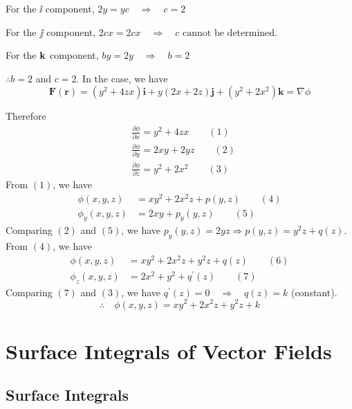 \begin{spacing}{1.3}
    For the $\ii$ component, $2 y=y c \quad \Rightarrow \quad c=2$

    For the $\jj$ component, $2 c x=2 c x \quad \Rightarrow \quad c \text { cannot be determined. }$
    
    For the ${\bf k}$ component, $b y=2 y \quad \Rightarrow \quad b=2$

    $\therefore b=2$ and $c=2 .$ In the case, we have
    $$\mathbf{F}(\mathbf{r})=\left(y^{2}+4 z x\right) \mathbf{i}+y(2 x+2 z) \mathbf{j}+\left(y^{2}+2 x^{2}\right) \mathbf{k}=\nabla \phi$$
    
    Therefore
    $$\begin{aligned}
    &\frac{\partial \phi}{\partial x}=y^{2}+4 z x \qquad (1)\\
    &\frac{\partial \phi}{\partial y}=2 x y+2 y z \qquad (2)\\
    &\frac{\partial \phi}{\partial z}=y^{2}+2 x^{2} \qquad (3)
    \end{aligned}$$
    From $(1)$, we have
    $$\begin{aligned}
    \phi(x, y, z) &=x y^{2}+2 x^{2} z+p(y, z) \qquad (4)\\
    \phi_{y}(x, y, z) &=2 x y+p_{y}(y, z) \qquad (5)
    \end{aligned}$$
    Comparing $(2)$ and $(5)$, we have $p_{y}(y, z)=2 y z \Rightarrow p(y, z)=y^{2} z+q(z) .$ From $(4)$, we have
    $$\begin{aligned}
    \phi(x, y, z) &=x y^{2}+2 x^{2} z+y^{2} z+q(z) \qquad(6)\\
    \phi_{z}(x, y, z) &=2 x^{2}+y^{2}+q^{\prime}(z) \qquad(7)
    \end{aligned}$$
    Comparing $(7)$ and $(3)$, we have $q^{\prime}(z)=0 \quad \Rightarrow \quad q(z)=k$ (constant).
    $$\therefore \quad \phi(x, y, z)=x y^{2}+2 x^{2} z+y^{2} z+k$$

    \newpage
    \section{Surface Integrals of Vector Fields}
    \subsection{Surface Integrals}


\end{spacing}

